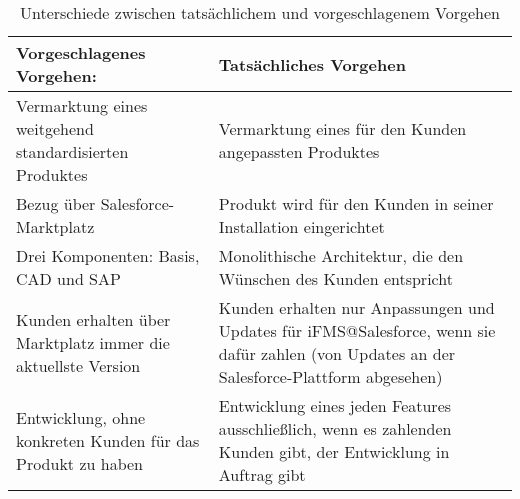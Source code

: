 \begin{table}[h]
\centering
\begin{tabular}{|p{}|p{}|}
\hline
\textbf{Vorgeschlagenes Vorgehen:} & \textbf{Tatsächliches Vorgehen} \\
\hline
Vermarktung eines weitgehend standardisierten Produktes & Vermarktung eines für 
den Kunden angepassten Produktes \\
\hline
Bezug über Salesforce-Marktplatz & Produkt wird für den Kunden in 
seiner Installation eingerichtet \\
\hline
Drei Komponenten: Basis, CAD und SAP & Monolithische Architektur, die den 
Wünschen des Kunden entspricht \\
\hline
Kunden erhalten über Marktplatz immer die aktuellste Version & Kunden erhalten 
nur Anpassungen und Updates für iFMS@Salesforce, wenn sie dafür zahlen (von Updates
an der Salesforce-Plattform abgesehen) \\
\hline
Entwicklung, ohne konkreten Kunden für das Produkt zu haben & Entwicklung 
eines jeden Features ausschließlich, wenn es zahlenden Kunden gibt, der 
Entwicklung in Auftrag gibt \\
\hline
\end{tabular}
\caption{Unterschiede zwischen tatsächlichem und vorgeschlagenem Vorgehen}
\label{tab:unterschiede_im_vorgehen}
\end{table}